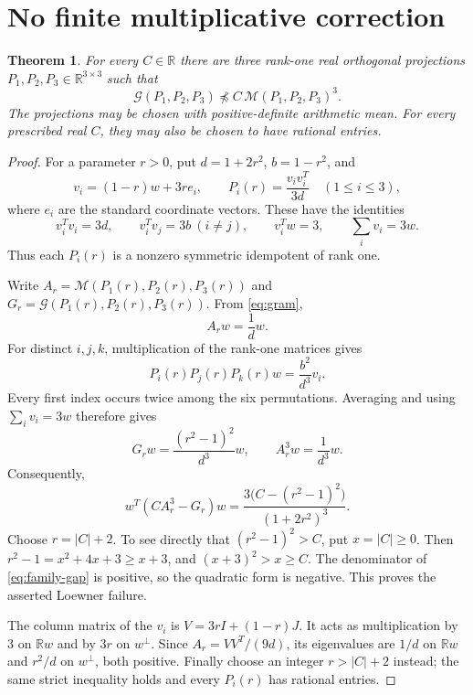 \documentclass[11pt]{article}
\newtheorem{theorem}{Theorem}
\newcommand{\R}{\mathbb R}
\newcommand{\G}{\mathcal G}
\newcommand{\M}{\mathcal M}
\begin{document}
\section{No finite multiplicative correction}

\begin{theorem}\label{thm:unbounded}
For every $C\in\R$ there are three rank-one real orthogonal projections $P_1,P_2,P_3\in\R^{3\times3}$ such that
\[
 \G(P_1,P_2,P_3)\not\preceq C\,\M(P_1,P_2,P_3)^3.
\]
The projections may be chosen with positive-definite arithmetic mean. For every prescribed real $C$, they may also be chosen to have rational entries.
\end{theorem}

\begin{proof}
For a parameter $r>0$, put $d=1+2r^2$, $b=1-r^2$, and
\[
 v_i=(1-r)w+3r e_i,\qquad P_i(r)=\frac{v_i v_i^T}{3d}\quad(1\le i\le3),
\]
where $e_i$ are the standard coordinate vectors. These have the identities
\begin{equation}\label{eq:gram}
 v_i^Tv_i=3d,\qquad v_i^Tv_j=3b\ (i\ne j),\qquad
 v_i^Tw=3,\qquad \sum_i v_i=3w.
\end{equation}
Thus each $P_i(r)$ is a nonzero symmetric idempotent of rank one.

Write $A_r=\M(P_1(r),P_2(r),P_3(r))$ and $G_r=\G(P_1(r),P_2(r),P_3(r))$. From \eqref{eq:gram},
\[
 A_rw=\frac1d w.
\]
For distinct $i,j,k$, multiplication of the rank-one matrices gives
\[
 P_i(r)P_j(r)P_k(r)w=\frac{b^2}{d^3}v_i.
\]
Every first index occurs twice among the six permutations. Averaging and using $\sum_i v_i=3w$ therefore gives
\begin{equation}\label{eq:family-action}
 G_rw=\frac{(r^2-1)^2}{d^3}w,\qquad
 A_r^3w=\frac1{d^3}w.
\end{equation}
Consequently,
\begin{equation}\label{eq:family-gap}
 w^T(CA_r^3-G_r)w
  =\frac{3\bigl(C-(r^2-1)^2\bigr)}{(1+2r^2)^3}.
\end{equation}
Choose $r=|C|+2$. To see directly that $(r^2-1)^2>C$, put $x=|C|\ge0$. Then
$r^2-1=x^2+4x+3\ge x+3$, and $(x+3)^2>x\ge C$.
The denominator of \eqref{eq:family-gap} is positive, so the quadratic form is negative. This proves the asserted Loewner failure.

The column matrix of the $v_i$ is $V=3rI+(1-r)J$. It acts as multiplication by $3$ on $\R w$ and by $3r$ on $w^\perp$. Since $A_r=VV^T/(9d)$, its eigenvalues are $1/d$ on $\R w$ and $r^2/d$ on $w^\perp$, both positive. Finally choose an integer $r>|C|+2$ instead; the same strict inequality holds and every $P_i(r)$ has rational entries.
\end{proof}
\end{document}
